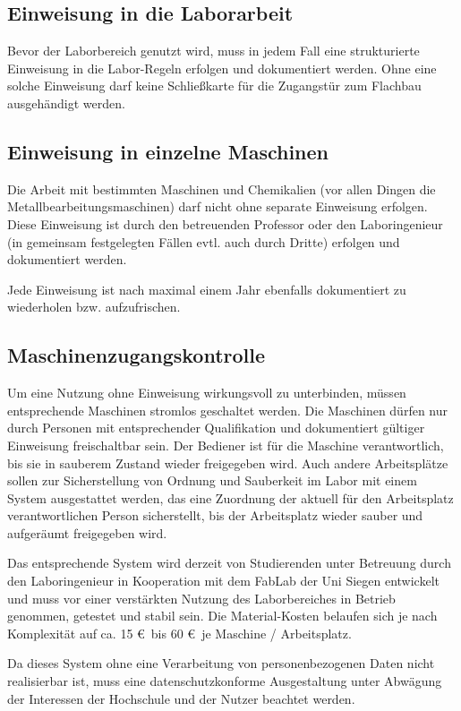 \documentclass[parskip=half,headsepline,footsepline,titlepage]{scrartcl}
\begin{document}
\subsection{Einweisung in die Laborarbeit}
Bevor der Laborbereich genutzt wird, muss in jedem Fall eine strukturierte Einweisung in die Labor-Regeln erfolgen und dokumentiert werden. Ohne eine solche Einweisung darf keine Schließkarte für die  Zugangstür zum Flachbau ausgehändigt werden.

\subsection{Einweisung in einzelne Maschinen}
Die Arbeit mit bestimmten Maschinen und Chemikalien (vor allen Dingen die Metallbearbeitungsmaschinen) darf nicht ohne separate Einweisung erfolgen. Diese Einweisung ist durch den betreuenden Professor oder den Laboringenieur (in gemeinsam festgelegten Fällen evtl. auch durch Dritte) erfolgen und dokumentiert werden. 

Jede Einweisung ist nach maximal einem Jahr ebenfalls dokumentiert zu wiederholen bzw. aufzufrischen.

\subsection{Maschinenzugangskontrolle}
Um eine Nutzung ohne Einweisung wirkungsvoll zu unterbinden, müssen entsprechende Maschinen stromlos geschaltet werden. Die Maschinen dürfen nur durch Personen mit entsprechender Qualifikation und dokumentiert gültiger Einweisung freischaltbar sein.
Der Bediener ist für die Maschine verantwortlich, bis sie in sauberem Zustand wieder freigegeben wird. Auch andere Arbeitsplätze sollen zur Sicherstellung von Ordnung und Sauberkeit im Labor mit einem System ausgestattet werden, das eine Zuordnung der aktuell für den Arbeitsplatz verantwortlichen Person sicherstellt, bis der Arbeitsplatz wieder sauber und aufgeräumt freigegeben wird.

Das entsprechende System wird derzeit von Studierenden unter Betreuung durch den Laboringenieur in Kooperation mit dem FabLab der Uni Siegen entwickelt und muss vor einer verstärkten Nutzung des Laborbereiches in Betrieb genommen, getestet und stabil sein.
Die Material-Kosten belaufen sich je nach Komplexität auf ca. 15 \euro\ bis 60 \euro\ je Maschine / Arbeitsplatz.

Da dieses System ohne eine Verarbeitung von personenbezogenen Daten nicht realisierbar ist, muss eine datenschutzkonforme Ausgestaltung unter Abwägung der Interessen der Hochschule und der Nutzer beachtet werden.
\end{document}
